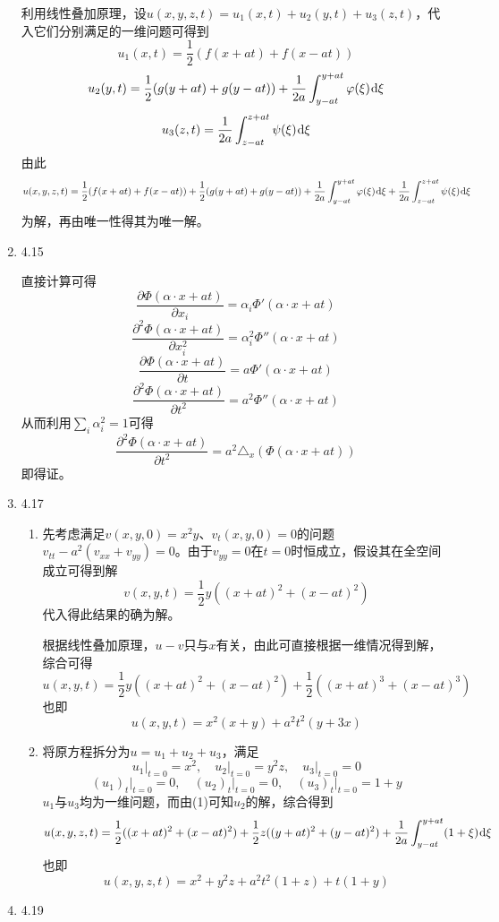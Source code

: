 \documentclass[a4paper,UTF8,fontset=windows,10pt]{ctexart}
\newcommand*{\dr}{\hspace{0.07em}\mathrm{d}}
\begin{document}
\begin{enumerate}
    利用线性叠加原理，设$u(x,y,z,t)=u_1(x,t)+u_2(y,t)+u_3(z,t)$，代入它们分别满足的一维问题可得到
    $$u_1(x,t)=\frac{1}{2}(f(x+at)+f(x-at))$$
    $$u_2(y,t)=\frac{1}{2}(g(y+at)+g(y-at))+\frac{1}{2a}\int_{y-at}^{y+at}\varphi(\xi)\dr\xi$$
    $$u_3(z,t)=\frac{1}{2a}\int_{z-at}^{z+at}\psi(\xi)\dr\xi$$
    由此
    $$u(x,y,z,t)=\frac{1}{2}(f(x+at)+f(x-at))+\frac{1}{2}(g(y+at)+g(y-at))+\frac{1}{2a}\int_{y-at}^{y+at}\varphi(\xi)\dr\xi+\frac{1}{2a}\int_{z-at}^{z+at}\psi(\xi)\dr\xi$$
    为解，再由唯一性得其为唯一解。
    
    \item 4.15
    
    直接计算可得
    $$\frac{\partial\Phi(\alpha\cdot x+at)}{\partial x_i}=\alpha_i\Phi'(\alpha\cdot x+at)$$
    $$\frac{\partial^2\Phi(\alpha\cdot x+at)}{\partial x_i^2}=\alpha_i^2\Phi''(\alpha\cdot x+at)$$
    $$\frac{\partial\Phi(\alpha\cdot x+at)}{\partial t}=a\Phi'(\alpha\cdot x+at)$$
    $$\frac{\partial^2\Phi(\alpha\cdot x+at)}{\partial t^2}=a^2\Phi''(\alpha\cdot x+at)$$
    从而利用$\sum_i\alpha_i^2=1$可得
    $$\frac{\partial^2\Phi(\alpha\cdot x+at)}{\partial t^2}=a^2\triangle_x(\Phi(\alpha\cdot x+at))$$
    即得证。
    
    \item 4.17
    \begin{enumerate}[(1)]
        \item 
        先考虑满足$v(x,y,0)=x^2y$、$v_t(x,y,0)=0$的问题$v_{tt}-a^2(v_{xx}+v_{yy})=0$。由于$v_{yy}=0$在$t=0$时恒成立，假设其在全空间成立可得到解
        $$v(x,y,t)=\frac{1}{2}y((x+at)^2+(x-at)^2)$$
        代入得此结果的确为解。
    
        根据线性叠加原理，$u-v$只与$x$有关，由此可直接根据一维情况得到解，综合可得
        $$u(x,y,t)=\frac{1}{2}y((x+at)^2+(x-at)^2)+\frac{1}{2}((x+at)^3+(x-at)^3)$$
        也即
        $$u(x,y,t)=x^2(x+y)+a^2t^2(y+3x)$$
    
        \item 
        将原方程拆分为$u=u_1+u_2+u_3$，满足
        $$u_1\big|_{t=0}=x^2,\quad u_2\big|_{t=0}=y^2z,\quad u_3\big|_{t=0}=0$$
        $$(u_1)_t\big|_{t=0}=0,\quad(u_2)_t\big|_{t=0}=0,\quad(u_3)_t\big|_{t=0}=1+y$$
        $u_1$与$u_3$均为一维问题，而由(1)可知$u_2$的解，综合得到
        $$u(x,y,z,t)=\frac{1}{2}((x+at)^2+(x-at)^2)+\frac{1}{2}z((y+at)^2+(y-at)^2)+\frac{1}{2a}\int_{y-at}^{y+at}(1+\xi)\dr\xi$$
        也即
        $$u(x,y,z,t)=x^2+y^2z+a^2t^2(1+z)+t(1+y)$$
    \end{enumerate}
    
    \item 4.19
    

\end{enumerate}
\end{document}

